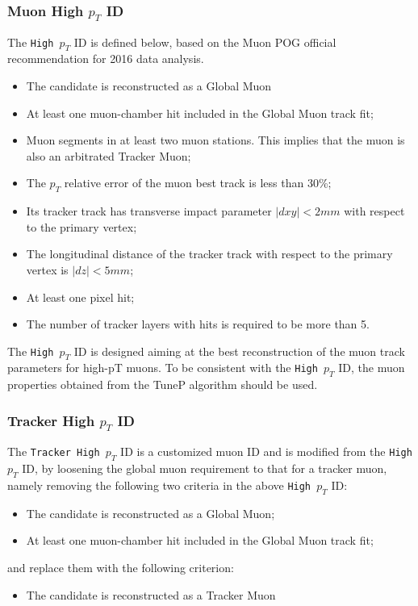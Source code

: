 \subsubsection{Muon High $p_T$ ID}
The \texttt{High $p_T$} ID is defined below, based on the Muon POG official recommendation for 2016 data analysis.
\begin{itemize}
\item  The candidate is reconstructed as a Global Muon 
\item  At least one muon-chamber hit included in the Global Muon track fit;
\item  Muon segments in at least two muon stations. This implies that the muon is also an arbitrated Tracker Muon; 
\item  The $p_T$ relative error of the muon best track is less than 30\%;
\item  Its tracker track has transverse impact parameter $|dxy| < 2 mm$ with respect to the primary vertex;
\item  The longitudinal distance of the tracker track with respect to the primary vertex is $|dz| < 5 mm$;
\item  At least one pixel hit;
\item  The number of tracker layers with hits is required to be more than 5.
\end{itemize}

The \texttt{High $p_T$} ID is designed aiming at the best reconstruction of the muon track parameters for high-pT muons. To be consistent with the \texttt{High $p_T$} ID, the muon properties obtained from the TuneP algorithm should be used.

\subsubsection{Tracker High $p_T$ ID}
The \texttt{Tracker High $p_T$} ID is a customized muon ID and is modified from the \texttt{High $p_T$} ID, by loosening the global muon requirement to that for a tracker muon, namely removing the following two criteria in the above \texttt{High $p_T$} ID:
\begin{itemize}
\item  The candidate is reconstructed as a Global Muon;
\item  At least one muon-chamber hit included in the Global Muon track fit;
\end{itemize}
and replace them with the following criterion:
\begin{itemize}
\item  The candidate is reconstructed as a Tracker Muon 
\end{itemize}

